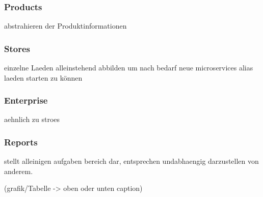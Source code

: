 		\subsubsection{Products}
		abstrahieren der Produktinformationen 
		
		\subsubsection{Stores}
		einzelne Laeden alleinstehend abbilden um nach bedarf neue microservices alias laeden starten zu können
		
		\subsubsection{Enterprise}
		aehnlich zu stroes
		
		\subsubsection{Reports}
		stellt alleinigen aufgaben bereich dar, entsprechen undabhaengig darzustellen von anderem.




	
	
(grafik/Tabelle  -> oben oder unten caption)